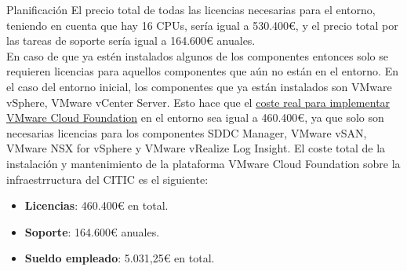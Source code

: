 \begin{chapter}{Planificación}
El precio total de todas las licencias necesarias para el entorno, teniendo en cuenta que hay 16 CPUs, sería igual a 530.400€, y el precio total por las tareas de soporte sería igual a 164.600€ anuales.\\

En caso de que ya estén instalados algunos de los componentes entonces solo se requieren licencias para aquellos componentes que aún no están en el entorno. En el caso del entorno inicial, los componentes que ya están instalados son VMware vSphere, VMware vCenter Server. Esto hace que el \underline{coste real para implementar VMware Cloud Foundation} en el entorno sea igual a 460.400€, ya que solo son necesarias licencias para los componentes SDDC Manager, VMware vSAN, VMware NSX for vSphere y VMware vRealize Log Insight. El coste total de la instalación y mantenimiento de la plataforma VMware Cloud Foundation sobre la infraestrructura del CITIC es el siguiente:

    \begin{itemize}
        \item \textbf{Licencias}: 460.400€ en total.
        \item \textbf{Soporte}: 164.600€ anuales.
        \item \textbf{Sueldo empleado}: 5.031,25€ en total.
    \end{itemize}


  \end{chapter}